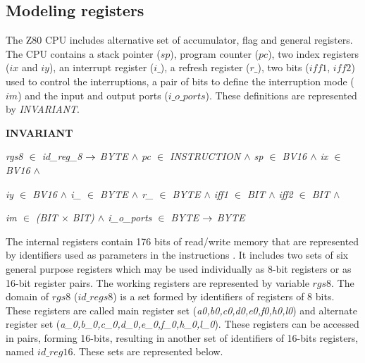 \documentclass[a4paper]{llncs}
\begin{document}
\subsection{Modeling registers}

The Z80 CPU includes alternative set of accumulator, flag and general registers. The CPU contains a stack
pointer ($\textit{sp}$), program counter ($\textit{pc}$), two index registers ($\textit{ix}$ and $\textit{iy}$), an
interrupt register ($\textit{i\_}$), a refresh register ($\textit{r\_}$), two bits ($\textit{iff1}$,
$\textit{iff2}$) used to control the interruptions, a pair of bits to define the interruption mode ($\textit{im}$)
and the input and output ports ($\textit{i\_o\_ports}$). These definitions are represented by
\textit{INVARIANT}.
  
\begin{sloppypar}
\bf INVARIANT

\hspace*{0.10in}\it rgs8  $\in$  \it id\_reg\_8  $\rightarrow$  \it BYTE  $\land$ \it pc  $\in$  \it INSTRUCTION  $\land$  \it sp  $\in$  \it BV16 $\land$  \it ix  $\in$  \it BV16  $\land$

\hspace*{0.10in}\it iy  $\in$  \it BV16  $\land$ \it i\_  $\in$  \it BYTE  $\land$  \it r\_ $\in$  \it BYTE  $\land$ \it iff1  $\in$  \it BIT  $\land$ \it iff2  $\in$  \it BIT  $\land$ 

\hspace*{0.10in}\it im $\in$ (\it BIT $\times$ \it BIT\rm )  $\land$  \it i\_o\_ports  $\in$  \it BYTE  $\rightarrow$  \it BYTE
\end{sloppypar}

% 

  The internal registers contain 176 bits of read/write memory that are represented by
identifiers used as parameters in the instructions . It includes two sets of six general purpose
registers which may be used individually as 8-bit registers or as 16-bit register pairs.  The working
registers are represented by variable $\textit{rgs8}$. The domain of $\textit{rgs8}$
($\textit{id\_regs8}$) is a set formed by identifiers of registers of 8 bits. These registers are called
main register set (\textit{a0,b0,c0,d0,e0,f0,h0,l0}) and alternate register set
(\textit{a\_0,b\_0,c\_0,d\_0,e\_0,f\_0,h\_0,l\_0}). These registers can be accessed in pairs, forming
16-bits, resulting in another set of identifiers of 16-bits registers, named $\textit{id\_reg16}$. These sets are represented below.
\end{document}
